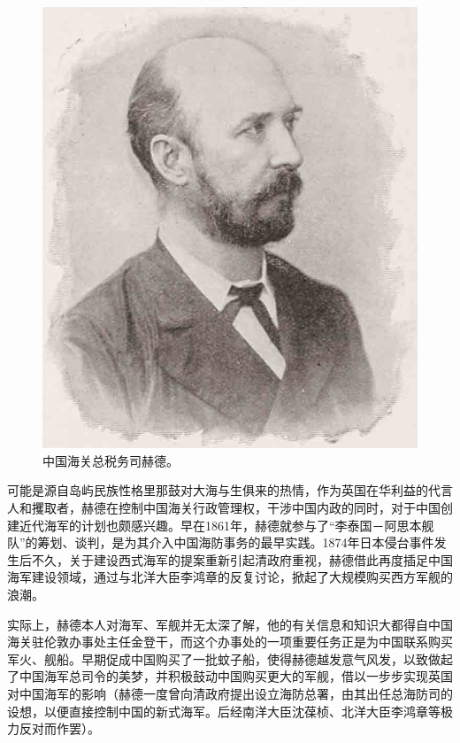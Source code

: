 \documentclass[12pt,UTF8]{ctexbook}
\begin{document}
\begin{figure}[htbp]
	\centering
	\includegraphics[width=1\linewidth]{Images/23}
	\caption{中国海关总税务司赫德。}
	\label{fig:1}
\end{figure}

可能是源自岛屿民族性格里那鼓对大海与生俱来的热情，作为英国在华利益的代言人和攫取者，赫德在控制中国海关行政管理权，干涉中国内政的同时，对于中国创建近代海军的计划也颇感兴趣。早在1861年，赫德就参与了“李泰国－阿思本舰队”的筹划、谈判，是为其介入中国海防事务的最早实践。1874年日本侵台事件发生后不久，关于建设西式海军的提案重新引起清政府重视，赫德借此再度插足中国海军建设领域，通过与北洋大臣李鸿章的反复讨论，掀起了大规模购买西方军舰的浪潮。

实际上，赫德本人对海军、军舰并无太深了解，他的有关信息和知识大都得自中国海关驻伦敦办事处主任金登干，而这个办事处的一项重要任务正是为中国联系购买军火、舰船。早期促成中国购买了一批蚊子船，使得赫德越发意气风发，以致做起了中国海军总司令的美梦，并积极鼓动中国购买更大的军舰，借以一步步实现英国对中国海军的影响（赫德一度曾向清政府提出设立海防总署，由其出任总海防司的设想，以便直接控制中国的新式海军。后经南洋大臣沈葆桢、北洋大臣李鸿章等极力反对而作罢）。
\end{document}
